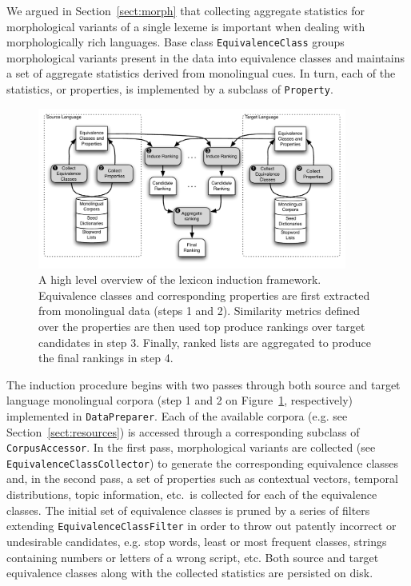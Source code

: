 \documentclass{article}
\newcommand{\secref}[1]{Section~\ref{#1}}
\newcommand{\figref}[1]{Figure~\ref{#1}}
\begin{document}
We argued in \secref{sect:morph} that collecting aggregate statistics for morphological variants of a single lexeme is important when dealing with morphologically rich languages.   Base class \small{\tt EquivalenceClass} groups morphological variants present in the data into equivalence classes and maintains a set of aggregate statistics derived from monolingual cues.  In turn, each of the statistics, or properties, is implemented by a subclass of \small{\tt Property}. \\

\begin{figure}[h!]
\centerline{\mbox{\includegraphics[width=4in]{figures/lexinduct}}}
\caption{A high level overview of the lexicon induction framework.  Equivalence classes and corresponding properties are first extracted from monolingual data (steps 1 and 2).  Similarity metrics defined over the properties are then used top produce rankings over target candidates in step 3.  Finally, ranked lists are aggregated to produce the final rankings in step 4.}
\label{fig:system}
\end{figure}

The induction procedure begins with two passes through both source and target language monolingual corpora (step 1 and 2 on \figref{fig:system}, respectively) implemented in \small{\tt DataPreparer}.  Each of the available corpora (e.g. see \secref{sect:resources}) is accessed through a corresponding subclass of \small{\tt CorpusAccessor}.  In the first pass, morphological variants are collected (see \small{\tt EquivalenceClassCollector}) to generate the corresponding equivalence classes and, in the second pass, a set of properties such as contextual vectors, temporal distributions, topic information, etc.\ is collected for each of the equivalence classes. The initial set of equivalence classes is pruned by a series of filters extending \small{\tt EquivalenceClassFilter} in order to throw out patently incorrect or undesirable candidates, e.g. stop words, least or most frequent classes, strings containing numbers or letters of a wrong script, etc. Both source and target equivalence classes along with the collected statistics are persisted on disk.\\
\end{document}
